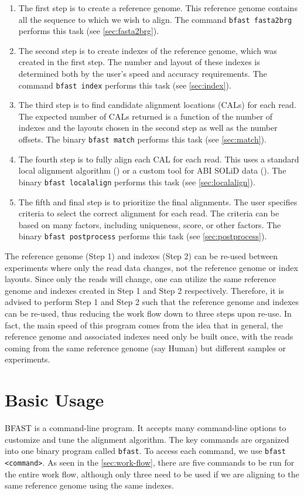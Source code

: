 \documentclass[a4paper,12pt]{book}
\newcommand{\TT}[1]{{\tt #1}} %
\begin{document}
\begin{enumerate}
	\item
		The first step is to create a reference genome.
		This reference genome contains all the sequence to which we wish to align.
		The command \TT{bfast fasta2brg} performs this task (see \autoref{sec:fasta2brg}).
	\item
		The second step is to create indexes of the reference genome, which was created in the first step.
		The number and layout of these indexes is determined both by the user's speed and accuracy requirements.
		The command \TT{bfast index} performs this task (see \autoref{sec:index}).
	\item
		The third step is to find candidate alignment locations (CALs) for each read.
		The expected number of CALs returned is a function of the number of indexes and the layouts chosen in the second step as well as the number offsets.
		The binary \TT{bfast match} performs this task (see \autoref{sec:match}).
	\item
		The fourth step is to fully align each CAL for each read.
		This uses a standard local alignment algorithm (\cite{SmithWaterman}) or a custom tool for ABI SOLiD data (\cite{BFAST-local-alignment}).
		The binary \TT{bfast localalign} performs this task (see \autoref{sec:localalign}).
	\item
		The fifth and final step is to prioritize the final alignments.
		The user specifies criteria to select the correct alignment for each read.
		The criteria can be based on many factors, including uniqueness, score, or other factors.
		The binary \TT{bfast postprocess} performs this task (see \autoref{sec:postprocess}).
\end{enumerate}

The reference genome (Step 1) and indexes (Step 2) can be re-used between experiments where only the read data changes, not the reference genome or index layouts.
Since only the reads will change, one can utilize the same reference genome and indexes created in Step 1 and Step 2 respectively.
Therefore, it is advised to perform Step 1 and Step 2 such that the reference genome and indexes can be re-used, thus reducing the work flow down to three steps upon re-use.
In fact, the main speed of this program comes from the idea that in general, the reference genome and associated indexes need only be built once, with the reads coming from the same reference genome (say Human) but different samples or experiments.

\chapter{Basic Usage}
BFAST is a command-line program.
It accepts many command-line options to customize and tune the alignment algorithm.
The key commands are organized into one binary program called \TT{bfast}.
To access each command, we use \TT{bfast <command>}.
As seen in the \autoref{sec:work-flow}, there are five commands to be run for the entire work flow, although only three need to be used if we are aligning to the same reference genome using the same indexes.
\end{document}

